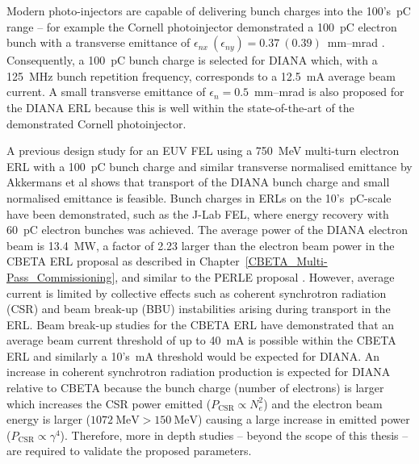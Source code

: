 \documentclass[../main.tex]{subfiles}
\begin{document}
Modern photo-injectors are capable of delivering bunch charges into the 100's~\si{\pico\coulomb} range \cite{angal2018perle,hounsell2021optimization} -- for example the Cornell photoinjector demonstrated a 100~\si{\pico\coulomb} electron bunch with a transverse emittance of $\epsilon_{nx}~\left(\epsilon_{ny}\right) = 0.37~ (0.39)$~\si{\milli\meter}--\si{\milli\radian} \cite{bartnik2015operational}. Consequently, a 100~\si{\pico\coulomb} bunch charge is selected for DIANA which, with a 125~\si{\mega\hertz} bunch repetition frequency, corresponds to a 12.5~\si{\milli\ampere} average beam current. A small transverse emittance of $\epsilon_{n}=0.5$~\si{\milli\meter}--\si{\milli\radian} is also proposed for the DIANA ERL because this is well within the state-of-the-art of the demonstrated Cornell photoinjector.

A previous design study for an EUV FEL using a 750~\si{\mega\electronvolt} multi-turn electron ERL with a 100~\si{\pico\coulomb} bunch charge and similar transverse normalised emittance by Akkermans et al\cite{akkermans2017compact} shows that transport of the DIANA bunch charge and small normalised emittance is feasible. Bunch charges in ERLs on the 10's~\si{\pico\coulomb}-scale have been demonstrated, such as the J-Lab FEL, where energy recovery with 60~\si{\pico\coulomb} electron bunches \cite{benson1999first} was achieved. The average power of the DIANA electron beam is 13.4~\si{\mega\watt}, a factor of 2.23 larger than the electron beam power in the CBETA ERL proposal as described in Chapter~\ref{CBETA_Multi-Pass_Commissioning}, and similar to the PERLE proposal \cite{angal2018perle}. However, average current is limited by collective effects such as coherent synchrotron radiation (CSR) and beam break-up (BBU) instabilities arising during transport in the ERL. Beam break-up studies for the CBETA ERL have demonstrated that an average beam current threshold of up to 40~\si{\milli\ampere} is possible within the CBETA ERL \cite{lou2019beam} and similarly a 10's~\si{\milli\ampere} threshold would be expected for DIANA. An increase in coherent synchrotron radiation production is expected for DIANA relative to CBETA because the bunch charge (number of electrons) is larger which increases the CSR power emitted ($P_{\mathrm{CSR}} \propto N_{e}^{2}$) and the electron beam energy is larger ($1072~\mathrm{\si{\mega\electronvolt}} > 150~\mathrm{\si{\mega\electronvolt}}$) causing a large increase in emitted power ($P_{\mathrm{CSR}}\propto \gamma^{4}$). Therefore, more in depth studies -- beyond the scope of this thesis -- are required to validate the proposed parameters. 
\end{document}
